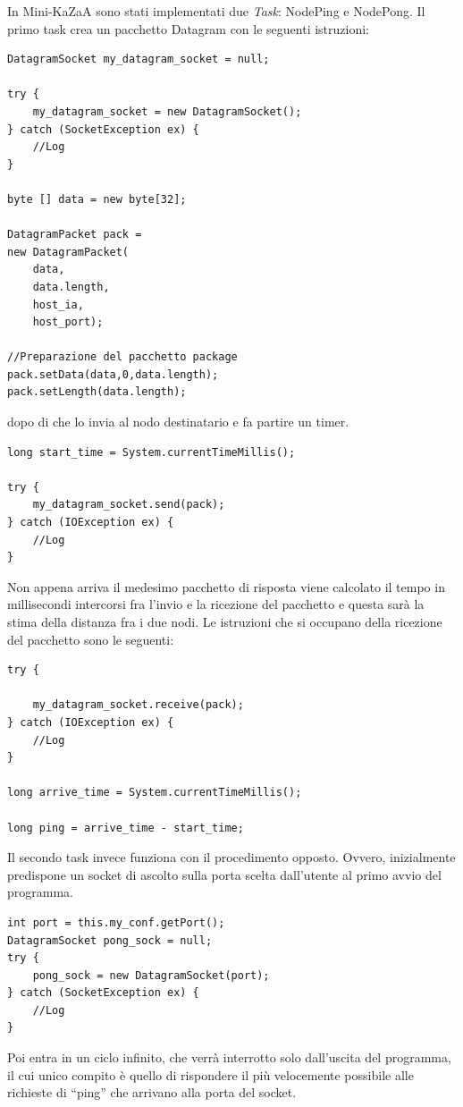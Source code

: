In Mini-KaZaA sono stati implementati due \emph{Task}: NodePing e NodePong.
Il primo task crea un pacchetto Datagram con le seguenti istruzioni:
\begin{lstlisting}
DatagramSocket my_datagram_socket = null;

try {
	my_datagram_socket = new DatagramSocket();
} catch (SocketException ex) {
	//Log
}
		
byte [] data = new byte[32];

DatagramPacket pack = 
new DatagramPacket(
	data,
	data.length, 
	host_ia, 
	host_port);

//Preparazione del pacchetto package
pack.setData(data,0,data.length);
pack.setLength(data.length);
\end{lstlisting}
dopo di che lo invia al nodo destinatario e fa partire un timer.
\begin{lstlisting}
long start_time = System.currentTimeMillis();

try {
	my_datagram_socket.send(pack);
} catch (IOException ex) {
	//Log
}
\end{lstlisting}
Non appena arriva il medesimo pacchetto di risposta viene calcolato il tempo in millisecondi intercorsi fra l'invio e la ricezione del pacchetto e questa sarà la stima della distanza fra i due nodi.
Le istruzioni che si occupano della ricezione del pacchetto sono le seguenti:
\begin{lstlisting}
try {

	my_datagram_socket.receive(pack);
} catch (IOException ex) {
	//Log
}

long arrive_time = System.currentTimeMillis();

long ping = arrive_time - start_time;
\end{lstlisting}
Il secondo task invece funziona con il procedimento opposto. Ovvero, inizialmente predispone un socket di ascolto sulla porta scelta dall'utente al primo avvio del programma.
\begin{lstlisting}
int port = this.my_conf.getPort();
DatagramSocket pong_sock = null;
try {
	pong_sock = new DatagramSocket(port);
} catch (SocketException ex) {
	//Log
}
\end{lstlisting}
Poi entra in un ciclo infinito, che verrà interrotto solo dall'uscita del programma, il cui unico compito è quello di rispondere il più velocemente possibile alle richieste di ``ping'' che arrivano alla porta del socket.


